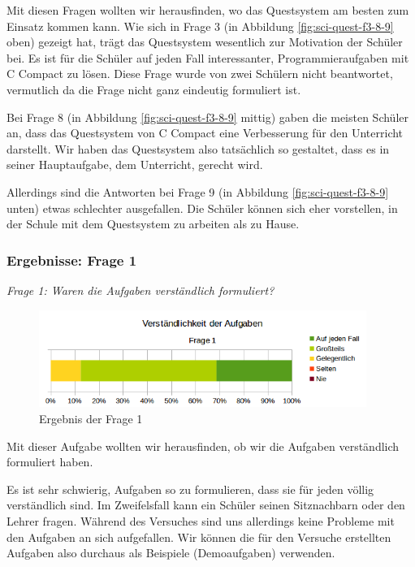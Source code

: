 Mit diesen Fragen wollten wir herausfinden, wo das Questsystem am besten zum Einsatz kommen kann. Wie sich in Frage 3 (in Abbildung \ref{fig:sci-quest-f3-8-9} oben) gezeigt hat, trägt das Questsystem wesentlich zur Motivation der Schüler bei. Es ist für die Schüler auf jeden Fall interessanter, Programmieraufgaben mit C Compact zu lösen. Diese Frage wurde von zwei Schülern nicht beantwortet, vermutlich da die Frage nicht ganz eindeutig formuliert ist.

Bei Frage 8 (in Abbildung \ref{fig:sci-quest-f3-8-9} mittig) gaben die meisten Schüler an, dass das Questsystem von C Compact eine Verbesserung für den Unterricht darstellt. Wir haben das Questsystem also tatsächlich so gestaltet, dass es in seiner Hauptaufgabe, dem Unterricht, gerecht wird.

Allerdings sind die Antworten bei Frage 9 (in Abbildung \ref{fig:sci-quest-f3-8-9} unten) etwas schlechter ausgefallen. Die Schüler können sich eher vorstellen, in der Schule mit dem Questsystem zu arbeiten als zu Hause.

\subsubsection*{Ergebnisse: Frage 1}

\emph{Frage 1: Waren die Aufgaben verständlich formuliert?}

\begin{figure}[h!]
\centering
\includegraphics[width=0.95\textwidth]{./media/images/gui/trials/quest-f1.png}
\caption{Ergebnis der Frage 1}
\label{fig:sci-quest-f1}
\end{figure}

Mit dieser Aufgabe wollten wir herausfinden, ob wir die Aufgaben verständlich formuliert haben.

Es ist sehr schwierig, Aufgaben so zu formulieren, dass sie für jeden völlig verständlich sind. Im Zweifelsfall kann ein Schüler seinen Sitznachbarn oder den Lehrer fragen. Während des Versuches sind uns allerdings keine Probleme mit den Aufgaben an sich aufgefallen. Wir können die für den Versuche erstellten Aufgaben also durchaus als Beispiele (Demoaufgaben) verwenden.

